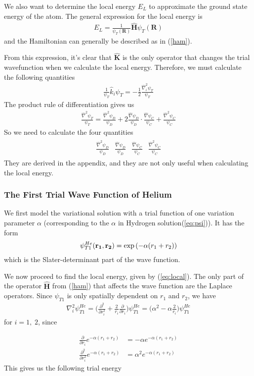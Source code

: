 \documentclass[twocolumns, a4paper,11pt,fleqn]{extarticle}
\newcommand{\eq}[1]{{\small\begin{align*}#1\end{align*}}}
\newcommand{\mat}[1]{\begin{matrix}#1\end{matrix}}
\renewcommand\vec[1]{\boldsymbol{\mathbf{#1}}}
\newcommand{\OP}[1]{\mathbf{\widehat{#1}}}
\newcommand{\op}[1]{\hat{#1}}
\begin{document}
We also want to determine the local energy $E_L$ to approximate
the ground state energy of the atom.
The general expression for the local energy is
\eq{
  E_L = \frac{1}{\psi_T (\vec R)}\OP H \psi_T (\vec R) 
}
and the Hamiltonian can generally be described as in (\ref{ham}).

From this expression, it's clear that $\OP K$ is the only operator that changes the
trial wavefunction when we calculate the local energy. Therefore, we must calculate the
following quantities
\eq{
  \frac{1}{\psi_T}\op k_i \psi_T = -\frac{1}{2}\frac{\op\nabla_i^2 \psi_T}{\psi_T}
}
The product rule of differentiation gives us
\eq{
  \frac{\op\nabla^2 \psi_T}{\psi_T} = 
  \frac{\op\nabla^2 \psi_D}{\psi_D}
    +2 \frac{\op\nabla \psi_D}{\psi_D}\cdot\frac{\op\nabla \psi_C}{\psi_C}
    +\frac{\op\nabla^2 \psi_C}{\psi_C}
}
So we need to calculate the four quantities
\eq{\mat{
  \frac{\op\nabla^2 \psi_D}{\psi_D}&
    \frac{\op\nabla \psi_D}{\psi_D}&
    \frac{\op\nabla \psi_C}{\psi_C}&
    \frac{\op\nabla^2 \psi_C}{\psi_C}
}}
They are derived in the appendix, and they are not only useful when calculating the
local energy.

\subsubsection{The First Trial Wave Function of Helium}
We first model the variational solution with a trial function of one
variation parameter $\alpha$ 
(corresponding to the $\alpha$ in Hydrogen solution(\ref{eq:psi})).
It has the form
\eq{
\psi_{T1}^{He}({\bf r_1},{\bf r_2}) = 
   \exp{\left(-\alpha(r_1+r_2)\right)}
}
which is the Slater-determinant part of the wave function.

We now proceed to find the local energy, given by (\ref{eq:local}).
The only part of the operator $\OP H$ from (\ref{ham}) that affects the wave function
are the Laplace operators.
Since $\psi_{T1}$ is only spatially dependent on $r_1$ and $r_2$, we have
\eq{
  \nabla_i^2 \psi_{T1}^{He} = \bigg( \frac{\partial^2}{\partial r_i^2} 
    + \frac{2}{r_i} \frac{\partial}{\partial r_i} \bigg) \psi_{T1}^{He}
    = \bigg( \alpha^2 -\alpha\frac{2}{r_i}  \bigg)\psi_{T1}^{He}
}
for $i = 1,\;2$, since

\eq{
  \frac{\partial}{\partial r_i} e^{-\alpha (r_1+r_2)}
    &= -\alpha e^{-\alpha (r_1+r_2)}\\
\frac{\partial^2}{\partial r_i^2} e^{-\alpha (r_1+r_2)}
    &= \alpha^2 e^{-\alpha (r_1+r_2)}
}
This gives us the following trial energy
\end{document}
